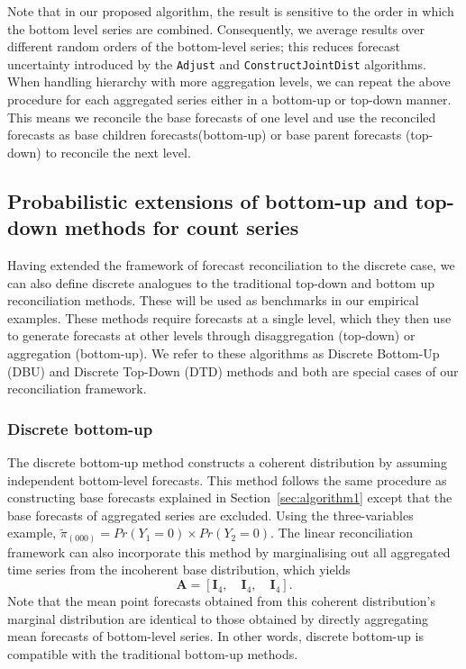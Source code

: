 \documentclass[a4paper,review,12pt,authoryear]{elsarticle}
\let\code=\texttt
\theoremstyle{definition}
\begin{document}
  Note that in our proposed algorithm, the result is sensitive to the order in which the bottom level series are combined. Consequently, we average results over different random orders of the bottom-level series; this reduces forecast uncertainty introduced by the \code{Adjust} and \code{ConstructJointDist} algorithms.
  When handling hierarchy with more aggregation levels, we can repeat the above procedure for each aggregated series either in a bottom-up or top-down manner. This means we reconcile the base forecasts of one level and use the reconciled forecasts as base children forecasts(bottom-up) or base parent forecasts (top-down) to reconcile the next level.



    \subsection{Probabilistic extensions of bottom-up and top-down methods for count series}

    Having extended the framework of forecast reconciliation to the discrete case, we can also define discrete analogues to the traditional top-down and bottom up reconciliation methods. These will be used as benchmarks in our empirical examples. These methods require forecasts at a single level, which they then use to generate forecasts at other levels through disaggregation (top-down) or aggregation (bottom-up).
    We refer to these algorithms as Discrete Bottom-Up (DBU) and Discrete Top-Down (DTD) methods and both are special cases of our reconciliation framework. 
    
    \subsubsection*{\textbf{Discrete bottom-up}}
    \label{sec:bottomup}

    The discrete bottom-up method constructs a coherent distribution by assuming independent bottom-level forecasts.
    This method follows the same procedure as constructing base forecasts explained in Section~\ref{sec:algorithm1} except that the base forecasts of aggregated series are excluded.
    Using the three-variables example, $\tilde{\pi}_{(000)} = Pr(Y_1=0)\times Pr(Y_2=0)$.
    The linear reconciliation framework can also incorporate this method by marginalising out all aggregated time series from the incoherent base distribution, which yields \[
    \mathbf{A} = [\mathbf{I}_4, \quad \mathbf{I}_4, \quad \mathbf{I}_4 ].
    \]
    Note that the mean point forecasts obtained from this coherent distribution's marginal distribution are identical to those obtained by directly aggregating mean forecasts of bottom-level series.
    In other words, discrete bottom-up is compatible with the traditional bottom-up methods.
\end{document}
